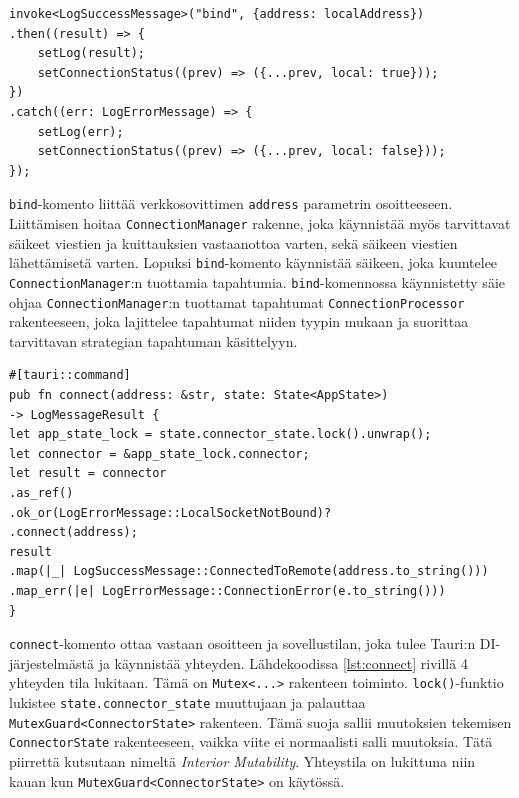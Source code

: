 \documentclass[a4paper,12pt]{article}
\begin{document}
    \begin{lstlisting}[caption={'bind'-komennon kutsuminen}, label={lst:calling_bind}]
invoke<LogSuccessMessage>("bind", {address: localAddress})
.then((result) => {
    setLog(result);
    setConnectionStatus((prev) => ({...prev, local: true}));
})
.catch((err: LogErrorMessage) => {
    setLog(err);
    setConnectionStatus((prev) => ({...prev, local: false}));
});\end{lstlisting}

    \lstinline{bind}-komento liittää verkkosovittimen \lstinline{address} parametrin osoitteeseen. Liittämisen hoitaa \lstinline{ConnectionManager} rakenne, joka käynnistää myös tarvittavat säikeet viestien ja kuittauksien vastaanottoa varten, sekä säikeen viestien lähettämisetä varten. Lopuksi \lstinline{bind}-komento käynnistää säikeen, joka kuuntelee \lstinline{ConnectionManager}:n tuottamia tapahtumia.
    \lstinline{bind}-komennossa käynnistetty säie ohjaa \lstinline{ConnectionManager}:n tuottamat tapahtumat \lstinline{ConnectionProcessor} rakenteeseen, joka lajittelee tapahtumat niiden tyypin mukaan ja suorittaa tarvittavan strategian tapahtuman käsittelyyn.\par


    \begin{lstlisting}[basicstyle=\small\ttfamily,caption={'connect'-komento}, label={lst:connect}]
#[tauri::command]
pub fn connect(address: &str, state: State<AppState>)
-> LogMessageResult {
let app_state_lock = state.connector_state.lock().unwrap();
let connector = &app_state_lock.connector;
let result = connector
.as_ref()
.ok_or(LogErrorMessage::LocalSocketNotBound)?
.connect(address);
result
.map(|_| LogSuccessMessage::ConnectedToRemote(address.to_string()))
.map_err(|e| LogErrorMessage::ConnectionError(e.to_string()))
}
    \end{lstlisting}


    \lstinline{connect}-komento ottaa vastaan osoitteen ja sovellustilan, joka tulee Tauri:n DI-järjestelmästä ja käynnistää yhteyden. Lähdekoodissa \ref{lst:connect} rivillä 4 yhteyden tila lukitaan.
    Tämä on \lstinline{Mutex<...>} rakenteen toiminto. \lstinline{lock()}-funktio lukistee \lstinline{state.connector_state} muuttujaan ja palauttaa \lstinline{MutexGuard<ConnectorState>} rakenteen. Tämä suoja sallii muutoksien tekemisen \lstinline{ConnectorState} rakenteeseen, vaikka viite ei normaalisti salli muutoksia. Tätä piirrettä kutsutaan nimeltä \textit{Interior Mutability}. Yhteystila on lukittuna niin kauan kun \lstinline{MutexGuard<ConnectorState>} on käytössä.\par
\end{document}
